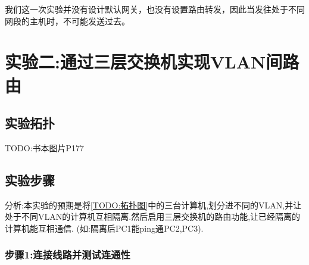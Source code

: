 \documentclass{myreport}
\begin{document}
我们这一次实验并没有设计默认网关，也没有设置路由转发，因此当发往处于不同网段的主机时，不可能发送过去。


\chapter{实验二:通过三层交换机实现VLAN间路由}

\section{实验拓扑}

TODO:书本图片P177

\section{实验步骤}

分析:本实验的预期是将\autoref{TODO:拓扑图}中的三台计算机,划分进不同的VLAN,并让处于不同VLAN的计算机互相隔离.然后启用三层交换机的路由功能,让已经隔离的计算机能互相通信.
(如:隔离后PC1能ping通PC2,PC3).

\subsection{步骤1:连接线路并测试连通性}
\end{document}
